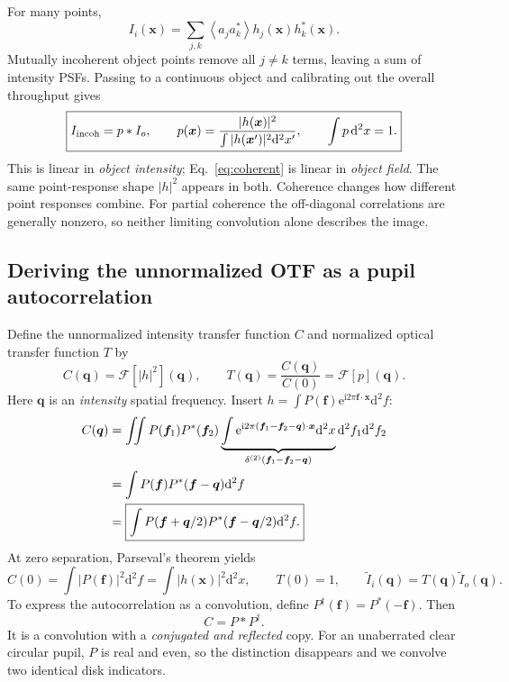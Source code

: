 \documentclass[11pt,a4paper]{article}
\numberwithin{equation}{section}
\newcommand{\dd}{\mathrm{d}}
\newcommand{\ii}{\mathrm{i}}
\newcommand{\ee}{\mathrm{e}}
\newcommand{\vct}[1]{\bm{#1}}
\newcommand{\avg}[1]{\left\langle #1\right\rangle}
\newcommand{\FT}{\mathcal F}
\begin{document}
For many points,
\[
I_i(\vct x)=\sum_{j,k}\avg{a_ja_k^*}h_j(\vct x)h_k^*(\vct x).
\]
Mutually incoherent object points remove all $j\ne k$ terms, leaving a
sum of intensity PSFs. Passing to a continuous object and calibrating
out the overall throughput gives
\begin{equation}
\boxed{I_{\rm incoh}=p*I_o,\qquad
p(\vct x)=\frac{|h(\vct x)|^2}{\int|h(\vct x')|^2\dd^2x'},\qquad
\int p\,\dd^2x=1.}
\label{eq:incoherent}
\end{equation}
This is linear in \emph{object intensity}; Eq.~\eqref{eq:coherent} is
linear in \emph{object field}. The same point-response shape $|h|^2$
appears in both. Coherence changes how different point responses combine.
For partial coherence the off-diagonal correlations are generally
nonzero, so neither limiting convolution alone describes the image.

\subsection{Deriving the unnormalized OTF as a pupil autocorrelation}
Define the unnormalized intensity transfer function $C$ and normalized
optical transfer function $T$ by
\begin{equation}
C(\vct q)=\FT[|h|^2](\vct q),\qquad
T(\vct q)=\frac{C(\vct q)}{C(0)}=\FT[p](\vct q).
\end{equation}
Here $\vct q$ is an \emph{intensity} spatial frequency.
Insert $h=\int P(\vct f)\ee^{\ii2\pi\vct f\cdot\vct x}\dd^2f$:
\begin{align}
C(\vct q)
&=\iint P(\vct f_1)P^*(\vct f_2)
\underbrace{\int\ee^{\ii2\pi(\vct f_1-\vct f_2-\vct q)\cdot\vct x}
\dd^2x}_{\delta^{(2)}(\vct f_1-\vct f_2-\vct q)}
\dd^2f_1\dd^2f_2\notag\\
&=\int P(\vct f)P^*(\vct f-\vct q)\dd^2f\notag\\
&=\boxed{\int P(\vct f+\vct q/2)P^*(\vct f-\vct q/2)\dd^2f.}
\label{eq:otf-autocorrelation}
\end{align}
At zero separation, Parseval's theorem yields
\begin{equation}
C(0)=\int|P(\vct f)|^2\dd^2f=\int|h(\vct x)|^2\dd^2x,
\qquad T(0)=1,\qquad
\widetilde I_i(\vct q)=T(\vct q)\widetilde I_o(\vct q).
\end{equation}
To express the autocorrelation as a convolution, define
$P^\dagger(\vct f)=P^*(-\vct f)$. Then
\begin{equation}
\boxed{C=P*P^\dagger.}
\end{equation}
It is a convolution with a \emph{conjugated and reflected} copy. For an unaberrated clear circular pupil, $P$ is real
and even, so the distinction disappears and we convolve two identical
disk indicators.
\end{document}
